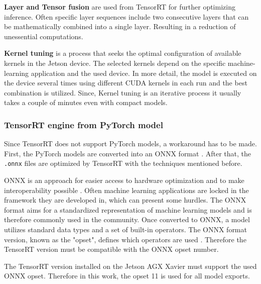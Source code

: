 \vspace{0.8cm}

\noindent\textbf{Layer and Tensor fusion} are used from TensorRT for further optimizing inference.
Often specific layer sequences include two consecutive layers that can be mathematically combined into a single layer.
Resulting in a reduction of unessential computations.

\vspace{0.8cm}

\noindent\textbf{Kernel tuning} is a process that seeks the optimal configuration of available kernels in the Jetson device.
The selected kernels depend on the specific machine-learning application and the used device.
In more detail, the model is executed on the device several times using different CUDA kernels in each run and the best combination is utilized.
Since, Kernel tuning is an iterative process it usually takes a couple of minutes even with compact models.

\subsubsection{TensorRT engine from PyTorch model}

Since TensorRT does not support PyTorch models, a workaround has to be made.
First, the PyTorch models are converted into an \ac{ONNX} format \cite{onnx_docu}.
After that, the \texttt{.onnx} files are optimized by TensorRT with the techniques mentioned before.

\vspace{0.8cm}

\ac{ONNX} is an approach for easier access to hardware optimization and to make interoperability possible \cite{onnx_docu}.
Often machine learning applications are locked in the framework they are developed in, which can present some hurdles.
The \ac{ONNX} format aims for a standardized representation of machine learning models and is therefore commonly used in the community.
Once converted to ONNX, a model utilizes standard data types and a set of built-in operators.
The \ac{ONNX} format version, known as the "opset", defines which operators are used \cite{onnx_docu}.
Therefore the TensorRT version must be compatible with the \ac{ONNX} opset number.

\vspace{0.8cm}

The TensorRT version installed on the Jetson AGX Xavier must support the used \ac{ONNX} opset.
Therefore in this work, the opset 11 is used for all model exports.

